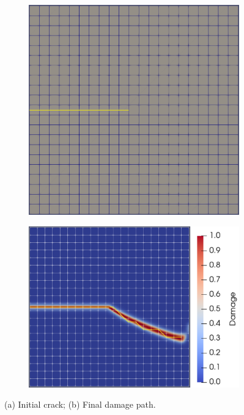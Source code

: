 \begin{figure}[h]
\begin{subfigure}{.45\textwidth}
  \centering
  \includegraphics[width=0.765\linewidth]{Chapter4/figures/nonplanar/3D_example_init.png}
  \caption{}
  \label{fig:init_crack}
\end{subfigure}%
\begin{subfigure}{.54\textwidth}
  \centering
  \includegraphics[width=0.83\linewidth]{Chapter4/figures/nonplanar/nonplanar_example.png}
  \caption{}
  \label{fig:crack_path}
\end{subfigure}%
  \caption{(a) Initial crack; (b) Final damage path.} 
  \label{fig:nonplanar_example}
\end{figure}